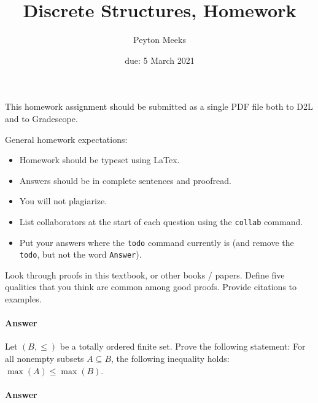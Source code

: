 \documentclass{article}
\title{Discrete Structures, Homework \hwnum}
\author{Peyton Meeks}
\date{due: 5 March 2021}
\begin{document}
\maketitle

This homework assignment should be
submitted as a single PDF file both to D2L and to Gradescope.

General homework expectations:
\begin{itemize}
    \item Homework should be typeset using LaTex.
    \item Answers should be in complete sentences and proofread.
    \item You will not plagiarize.
    \item List collaborators at the start of each question using the \texttt{collab} command.
    \item Put your answers where the \texttt{todo} command currently is (and
        remove the \texttt{todo}, but not the word \texttt{Answer}).
\end{itemize}


\collab{\todo{}} 

Look through proofs in this textbook, or other books / papers.  Define five
qualities that you think are common among good proofs. Provide citations to
examples.


\paragraph{Answer}




 

Let $(B,\leq)$ be a totally ordered finite set. Prove the following
statement: For all nonempty subsets $A \subseteq B$, the following inequality
holds: $\max(A) \leq \max(B)$.

\paragraph{Answer}
\end{document}
